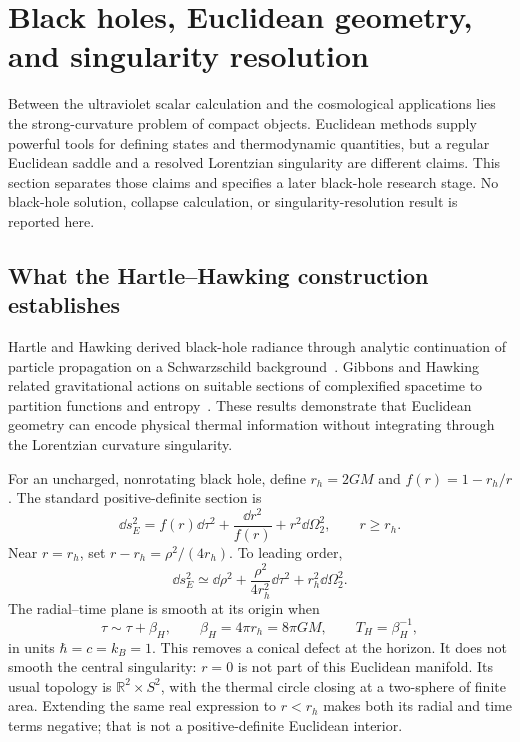 \section{Black holes, Euclidean geometry, and singularity resolution}
\label{sec:black-holes}

Between the ultraviolet scalar calculation and the cosmological applications lies the strong-curvature problem of compact objects.  Euclidean methods supply powerful tools for defining states and thermodynamic quantities, but a regular Euclidean saddle and a resolved Lorentzian singularity are different claims.  This section separates those claims and specifies a later black-hole research stage.  No black-hole solution, collapse calculation, or singularity-resolution result is reported here.

\subsection{What the Hartle--Hawking construction establishes}
\label{sec:hartle-hawking}

Hartle and Hawking derived black-hole radiance through analytic continuation of particle propagation on a Schwarzschild background~\cite{HartleHawking:1976}.  Gibbons and Hawking related gravitational actions on suitable sections of complexified spacetime to partition functions and entropy~\cite{GibbonsHawking:1977}.  These results demonstrate that Euclidean geometry can encode physical thermal information without integrating through the Lorentzian curvature singularity.

For an uncharged, nonrotating black hole, define $r_h=2GM$ and $f(r)=1-r_h/r$.  The standard positive-definite section is
\begin{equation}
 \dd s_E^2=f(r)\dd\tau^2+\frac{\dd r^2}{f(r)}+r^2\dd\Omega_2^2,
 \qquad r\geq r_h.
 \label{eq:euclidean-schwarzschild}
\end{equation}
Near $r=r_h$, set $r-r_h=\rho^2/(4r_h)$.  To leading order,
\begin{equation}
 \dd s_E^2\simeq\dd\rho^2+\frac{\rho^2}{4r_h^2}\dd\tau^2
 +r_h^2\dd\Omega_2^2.
 \label{eq:euclidean-bolt}
\end{equation}
The radial--time plane is smooth at its origin when
\begin{equation}
 \tau\sim\tau+\beta_H,\qquad
 \beta_H=4\pi r_h=8\pi GM,\qquad T_H=\beta_H^{-1},
 \label{eq:hawking-period}
\end{equation}
in units $\hbar=c=k_B=1$.  This removes a conical defect at the horizon.  It does not smooth the central singularity: $r=0$ is not part of this Euclidean manifold.  Its usual topology is $\mathbb{R}^2\times S^2$, with the thermal circle closing at a two-sphere of finite area.  Extending the same real expression to $r<r_h$ makes both its radial and time terms negative; that is not a positive-definite Euclidean interior.

